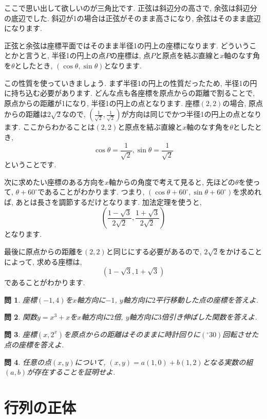 \documentclass[a4paper,12pt]{jreport}
\newtheorem{problem}{問}[chapter]
\theoremstyle{definition}
\newcommand{\ang}[1]{#1^\circ}
\begin{document}
   ここで思い出して欲しいのが三角比です.
   正弦は斜辺分の高さで,
   余弦は斜辺分の底辺でした.
   斜辺が1の場合は正弦がそのまま高さになり,
   余弦はそのまま底辺になります.

   正弦と余弦は座標平面ではそのまま半径1の円上の座標になります.
   どういうことかと言うと,
   半径1の円上の点$P$の座標は,
   点$P$と原点を結ぶ直線と$x$軸のなす角を$\theta$としたとき,
   $(\cos{\theta}, \sin{\theta})$となります.

   この性質を使っていきましょう.
   まず半径1の円上の性質だったため,
   半径1の円に持ち込む必要があります.
   どんな点も各座標を原点からの距離で割ることで,
   原点からの距離が1になり,
   半径1の円上の点となります.
   座標$(2,2)$の場合,
   原点からの距離は$2\sqrt{2}$なので,
   $(\frac{1}{\sqrt{2}},\frac{1}{\sqrt{2}})$が方向は同じでかつ半径1の円上の点となります.
   ここからわかることは$(2,2)$と原点を結ぶ直線と$x$軸のなす角を$\theta$としたとき,
   $$\cos{\theta}=\frac{1}{\sqrt{2}}, \sin\theta=\frac{1}{\sqrt{2}}$$
   ということです.

   次に求めたい座標のある方向を$x$軸からの角度で考えて見ると,
   先ほどの$\theta$を使って,
   $\theta+\ang{60}$であることがわかります.
   つまり,
   $(\cos\theta+\ang{60},\sin\theta+\ang{60})$を求めれば,
   あとは長さを調節するだけとなります.
   加法定理を使うと,
   $$\left(\frac{1-\sqrt{3}}{2\sqrt{2}},\frac{1+\sqrt{3}}{2\sqrt{2}}\right)$$
   となります.
   
   最後に原点からの距離を$(2,2)$と同じにする必要があるので,
   $2\sqrt{2}$をかけることによって,
   求める座標は,
   $$\left(1-\sqrt{3},1+\sqrt{3}\right)$$
   であることがわかります.

   \begin{problem}
      座標$(-1,4)$を$x$軸方向に$-1$, $y$軸方向に$2$平行移動した点の座標を答えよ.
   \end{problem}
   \begin{problem}
      関数$y=x^3+x$を$x$軸方向に$2$倍, $y$軸方向に$3$倍引き伸ばした関数を答えよ.
   \end{problem}
   \begin{problem}
      座標$(x,2^x)$を原点からの距離はそのままに時計回りに$\ang(30)$回転させた点の座標を答えよ.
   \end{problem}
   \begin{problem}
      任意の点$(x,y)$について, $(x,y)=a(1,0)+b(1,2)$となる実数の組$(a,b)$が存在することを証明せよ.
   \end{problem}

   \newpage

   \section{行列の正体}
\end{document}
